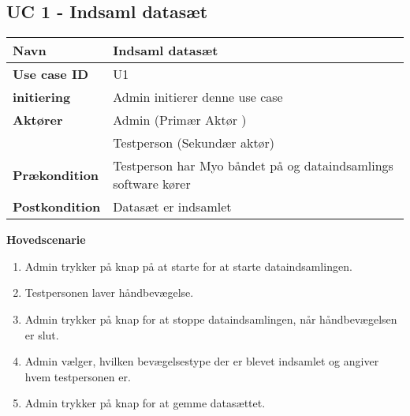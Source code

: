 \subsection{UC 1 - Indsaml datasæt}
\begin{table}[htbp] 
	\begin{tabular}{|p{5cm}|p{9cm}|}
		\hline
		\textbf{Navn} & Indsaml datasæt \\ \hline
		\textbf{Use case ID} & U1 \\ \hline
		\textbf{initiering} & Admin initierer denne use case \\ \hline
		\textbf{Aktører} & Admin (Primær Aktør ) \\ & Testperson (Sekundær aktør) \\ \hline
		\textbf{Prækondition} & Testperson har Myo båndet på og dataindsamlings software kører \\ \hline
		\textbf{Postkondition} & Datasæt er indsamlet \\ \hline
	\end{tabular}
\end{table}
\textbf{Hovedscenarie}
\begin{enumerate}
	\item Admin trykker på knap på at starte for at starte dataindsamlingen.
	\item Testpersonen laver håndbevægelse.
	\item Admin trykker på knap for at stoppe dataindsamlingen, når håndbevægelsen er slut.
	\item Admin vælger, hvilken bevægelsestype der er blevet indsamlet og angiver hvem testpersonen er.
	\item Admin trykker på knap for at gemme datasættet.
\end{enumerate}

